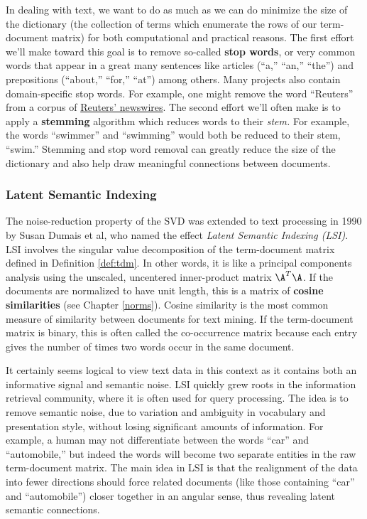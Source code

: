 \documentclass[
]{article}
\theoremstyle{definition}
\theoremstyle{definition}
\theoremstyle{definition}
\theoremstyle{definition}
\theoremstyle{remark}
\begin{document}
In dealing with text, we want to do as much as we can do minimize the size of the dictionary (the collection of terms which enumerate the rows of our term-document matrix) for both computational and practical reasons. The first effort we'll make toward this goal is to remove so-called \textbf{stop words}, or very common words that appear in a great many sentences like articles (``a,'' ``an,'' ``the'') and prepositions (``about,'' ``for,'' ``at'') among others. Many projects also contain domain-specific stop words. For example, one might remove the word ``Reuters'' from a corpus of \href{https://shainarace.github.io/Reuters/}{Reuters' newswires}. The second effort we'll often make is to apply a \textbf{stemming} algorithm which reduces words to their \emph{stem.} For example, the words ``swimmer'' and ``swimming'' would both be reduced to their stem, ``swim.'' Stemming and stop word removal can greatly reduce the size of the dictionary and also help draw meaningful connections between documents.

\hypertarget{latent-semantic-indexing}{%
\subsubsection{Latent Semantic Indexing}\label{latent-semantic-indexing}}

The noise-reduction property of the SVD was extended to text processing in 1990 by Susan Dumais et al, who named the effect \emph{Latent Semantic Indexing (LSI)}. LSI involves the singular value decomposition of the term-document matrix defined in Definition \ref{def:tdm}. In other words, it is like a principal components analysis using the unscaled, uncentered inner-product matrix \(\A^T\A\). If the documents are normalized to have unit length, this is a matrix of \textbf{cosine similarities} (see Chapter \ref{norms}). Cosine similarity is the most common measure of similarity between documents for text mining. If the term-document matrix is binary, this is often called the co-occurrence matrix because each entry gives the number of times two words occur in the same document.

It certainly seems logical to view text data in this context as it contains both an informative signal and semantic noise. LSI quickly grew roots in the information retrieval community, where it is often used for query processing. The idea is to remove semantic noise, due to variation and ambiguity in vocabulary and presentation style, without losing significant amounts of information. For example, a human may not differentiate between the words ``car'' and ``automobile,'' but indeed the words will become two separate entities in the raw term-document matrix. The main idea in LSI is that the realignment of the data into fewer directions should force related documents (like those containing ``car'' and ``automobile'') closer together in an angular sense, thus revealing latent semantic connections.
\end{document}
